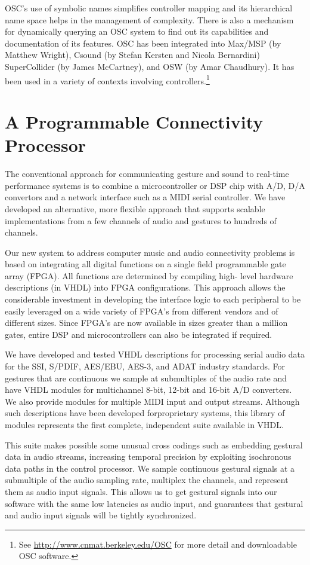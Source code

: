 OSC's use of symbolic names simplifies controller mapping and its hierarchical name space helps in the management of complexity. There is also a mechanism for dynamically querying an OSC system to find out its capabilities and documentation of its features. OSC has been integrated into Max/MSP (by Matthew Wright), Csound (by Stefan Kersten and Nicola Bernardini) SuperCollider (by James McCartney), and OSW (by Amar Chaudhury). It has been used in a variety of contexts involving controllers.\footnote{See \url{http://www.cnmat.berkeley.edu/OSC} for more detail and downloadable OSC software.}

\section{A Programmable Connectivity Processor}

The conventional approach for communicating gesture and sound to real-time performance systems is to combine a microcontroller or DSP chip with A/D, D/A convertors and a network interface such as a MIDI serial controller. We have developed an alternative, more flexible approach that supports scalable implementations from a few channels of audio and gestures to hundreds of channels.

Our new system to address computer music and audio connectivity problems is based on integrating all digital functions on a single field programmable gate array (FPGA). All functions are determined by compiling high- level hardware descriptions (in VHDL) into FPGA configurations. This approach allows the considerable investment in developing the interface logic to each peripheral to be easily leveraged on a wide variety of FPGA's from different vendors and of different sizes. Since FPGA's are now available in sizes greater than a million gates, entire DSP and microcontrollers can also be integrated if required.

We have developed and tested VHDL descriptions for processing serial audio data for the SSI, S/PDIF, AES/EBU, AES-3, and ADAT industry standards. For gestures that are continuous we sample at submultiples of the audio rate and have VHDL modules for multichannel 8-bit, 12-bit and 16-bit A/D converters. We also provide modules for multiple MIDI input and output streams. Although such descriptions have been developed forproprietary systems, this library of modules represents the first complete, independent suite available in VHDL.

This suite makes possible some unusual cross codings such as embedding gestural data in audio streams, increasing temporal precision by exploiting isochronous data paths in the control processor. We sample continuous gestural signals at a submultiple of the audio sampling rate, multiplex the channels, and represent them as audio input signals. This allows us to get gestural signals into our software with the same low latencies as audio input, and guarantees that gestural and audio input signals will be tightly synchronized.

